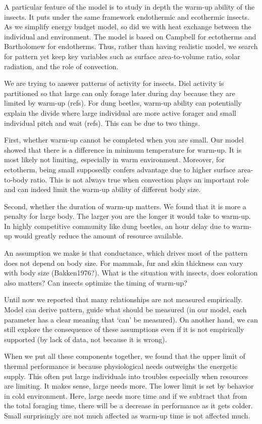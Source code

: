 A particular feature of the model is to study in depth the warm-up ability of the insects.
It puts under the same framework endothermic and ecothermic insects.
As we simplify energy budget model, so did we with heat exchange between the individual and environment.
The model is based on Campbell for ectotherms and Bartholomew for endotherms.
Thus, rather than having realistic model, we search for pattern yet keep key variables such as surface area-to-volume ratio, solar radiation, and the role of convection.

We are trying to answer patterns of activity for insects.
Diel activity is partitioned so that large can only forage later during day because they are limited by warm-up (refs).
For dung beetles, warm-up ability can potentially explain the divide where large individual are more active forager and small individual pitch and wait (refs).
This can be due to two things.

First, whether warm-up cannot be completed when you are small.
Our model showed that there is a difference in minimum temperature for warm-up. 
It is most likely not limiting, especially in warm environment.
Moreover, for ectotherm, being small supposedly confers advantage due to higher surface area-to-body ratio. 
This is not always true when convection plays an important role and can indeed limit the warm-up ability of different body size.

Second, whether the duration of warm-up matters.
We found that it is more a penalty for large body.
The larger you are the longer it would take to warm-up.
In highly competitive community like dung beetles, an hour delay due to warm-up would greatly reduce the amount of resource available. 

An assumption we make is that conductance, which drives most of the pattern does not depend on body size.
For mammals, fur and skin thickness can vary with body size (Bakken1976?).
What is the situation with insects, does coloration also matters?
Can insects optimize the timing of warm-up?

Until now we reported that many relationships are not measured empirically.
Model can derive pattern, guide what should be measured (in our model, each parameter has a clear meaning that `can' be measured).
On another hand, we can still explore the consequence of these assumptions even if it is not empirically supported (by lack of data, not because it is wrong).

When we put all these components together, we found that the upper limit of thermal performance is because physiological needs outweighs the energetic supply.
This often put large individuals into troubles especially when resources are limiting.
It makes sense, large needs more.
The lower limit is set by behavior in cold environment.
Here, large needs more time and if we subtract that from the total foraging time,  there will be a decrease in performance as it gets colder.
Small surprisingly are not much affected as warm-up time is not affected much.

